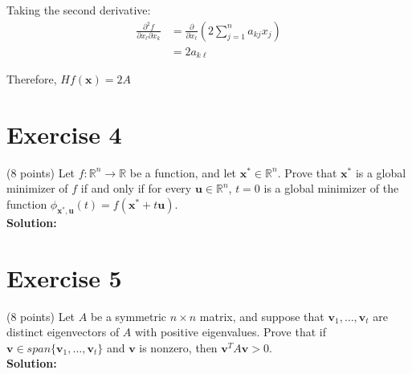 \documentclass{article}
\begin{document}
Taking the second derivative:
\begin{align*}
\frac{\partial^2 f}{\partial x_\ell \partial x_k} &= \frac{\partial}{\partial x_\ell}(2\sum_{j=1}^n a_{kj}x_j) \\
&= 2a_{k\ell}
\end{align*}

Therefore, $Hf(\mathbf{x}) = 2A$

\newpage

\section*{Exercise 4}
(8 points) Let $f: \mathbb{R}^n \to \mathbb{R}$ be a function, and let $\mathbf{x}^* \in \mathbb{R}^n$. Prove that $\mathbf{x}^*$ is a global minimizer of $f$ if and only if for every $\mathbf{u} \in \mathbb{R}^n$, $t = 0$ is a global minimizer of the function $\phi_{\mathbf{x}^*,\mathbf{u}}(t) = f(\mathbf{x}^* + t\mathbf{u})$. \\

\textbf{Solution:}

\newpage

\section*{Exercise 5}
(8 points) Let $A$ be a symmetric $n \times n$ matrix, and suppose that $\mathbf{v}_1,\ldots,\mathbf{v}_t$ are distinct eigenvectors of $A$ with positive eigenvalues. Prove that if $\mathbf{v} \in span\{\mathbf{v}_1,\ldots,\mathbf{v}_t\}$ and $\mathbf{v}$ is nonzero, then $\mathbf{v}^T A\mathbf{v} > 0$. \\

\textbf{Solution:}

\newpage
\end{document}
